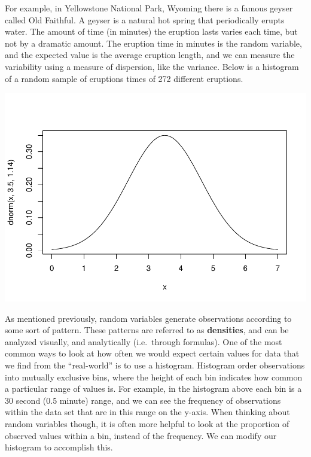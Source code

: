 \documentclass[
]{book}
\newenvironment{Shaded}{\begin{snugshade}}{\end{snugshade}}
\newcommand{\DataTypeTok}[1]{\textcolor[rgb]{0.13,0.29,0.53}{#1}}
\newcommand{\DecValTok}[1]{\textcolor[rgb]{0.00,0.00,0.81}{#1}}
\newcommand{\FloatTok}[1]{\textcolor[rgb]{0.00,0.00,0.81}{#1}}
\newcommand{\KeywordTok}[1]{\textcolor[rgb]{0.13,0.29,0.53}{\textbf{#1}}}
\newcommand{\NormalTok}[1]{#1}
\newcommand{\OperatorTok}[1]{\textcolor[rgb]{0.81,0.36,0.00}{\textbf{#1}}}
\newcommand{\StringTok}[1]{\textcolor[rgb]{0.31,0.60,0.02}{#1}}
\begin{document}
For example, in Yellowstone National Park, Wyoming there is a famous geyser called Old Faithful. A geyser is a natural hot spring that periodically erupts water. The amount of time (in minutes) the eruption lasts varies each time, but not by a dramatic amount. The eruption time in minutes is the random variable, and the expected value is the average eruption length, and we can measure the variability using a measure of dispersion, like the variance. Below is a histogram of a random sample of eruptions times of 272 different eruptions.

\begin{Shaded}
\end{Shaded}

\includegraphics{_main_files/figure-latex/unnamed-chunk-276-1.pdf}

As mentioned previously, random variables generate observations according to some sort of pattern. These patterns are referred to as \textbf{densities}, and can be analyzed visually, and analytically (i.e.~through formulas). One of the most common ways to look at how often we would expect certain values for data that we find from the ``real-world'' is to use a histogram. Histogram order observations into mutually exclusive bins, where the height of each bin indicates how common a particular range of values is. For example, in the histogram above each bin is a 30 second (0.5 minute) range, and we can see the frequency of observations within the data set that are in this range on the y-axis. When thinking about random variables though, it is often more helpful to look at the proportion of observed values within a bin, instead of the frequency. We can modify our histogram to accomplish this.
\end{document}
